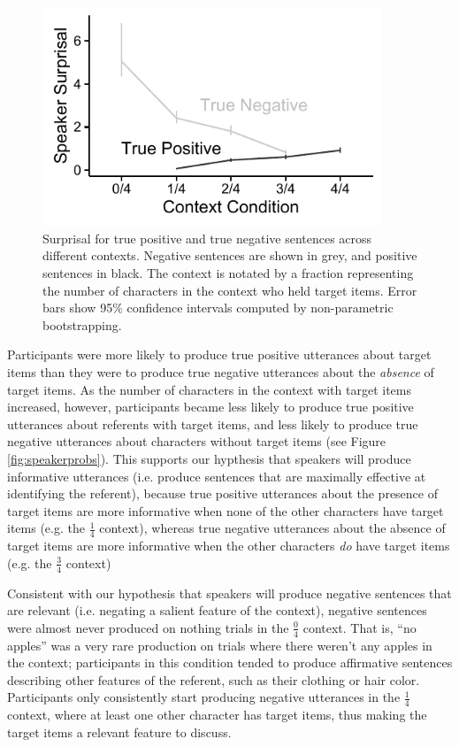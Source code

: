 \documentclass[man, noapacite]{apa2}
\begin{document}
\begin{figure}[t]
\begin{center} 
\includegraphics[width=4in]{figures/surprisals_mod.pdf}
\caption{\label{fig:speakersurprise} Surprisal for true positive and true negative sentences across different contexts. Negative sentences are shown in grey, and positive sentences in black.  The context is notated by a fraction representing the number of characters in the context who held target items. Error bars show 95\% confidence intervals computed by non-parametric bootstrapping.  }
\end{center} 
\end{figure}

Participants were more likely to produce true positive utterances about target items than they were to produce true negative utterances about the \emph{absence} of target items. As the number of characters in the context with target items increased, however, participants became less likely to produce true positive utterances about referents with target items, and less likely to produce true negative utterances about characters without target items (see Figure \ref{fig:speakerprobs}). This supports our hypthesis that speakers will produce informative utterances (i.e. produce sentences that are maximally effective at identifying the referent), because true positive utterances about the presence of target items are more informative when none of the other characters have target items (e.g. the $\frac{1}{4}$ context), whereas true negative utterances about the absence of target items are more informative when the other characters \emph{do} have target items (e.g. the $\frac{3}{4}$ context)

Consistent with our hypothesis that speakers will produce negative sentences that are relevant (i.e. negating a salient feature of the context), negative sentences were almost never produced on nothing trials in the $\frac{0}{4}$ context. That is, ``no apples'' was a very rare production on trials where there weren't any apples in the context; participants in this condition tended to produce affirmative sentences describing other features of the referent, such as their clothing or hair color. Participants only consistently start producing negative utterances in the $\frac{1}{4}$ context, where at least one other character has target items, thus making the target items a relevant feature to discuss. 
\end{document}
